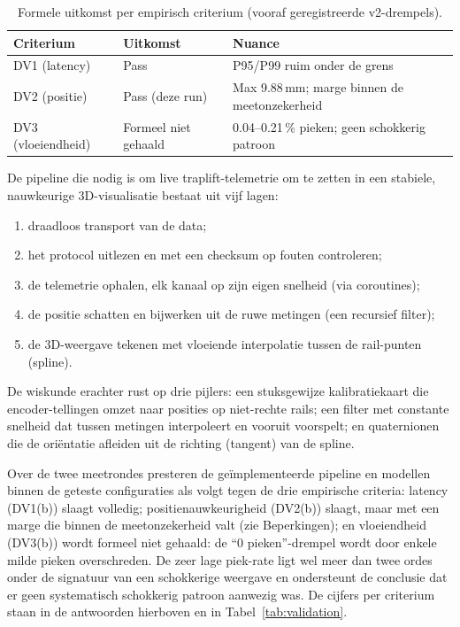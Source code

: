 \documentclass[10pt, a4paper, twocolumn]{article}
\begin{document}
\begin{table}[H]
\centering
\caption{Formele uitkomst per empirisch criterium (vooraf geregistreerde v2-drempels).}
\label{tab:criteria-outcome}
\small
\begin{tabular}{@{}p{1.9cm}p{1.8cm}p{4.0cm}@{}}
\toprule
\textbf{Criterium} & \textbf{Uitkomst} & \textbf{Nuance} \\
\midrule
DV1 (latency) & Pass & P95/P99 ruim onder de grens \\
DV2 (positie) & Pass (deze run) & Max 9.88\,mm; marge binnen de meetonzekerheid \\
DV3 (vloeiendheid) & Formeel niet gehaald & 0.04--0.21\,\% pieken; geen schokkerig patroon \\
\bottomrule
\end{tabular}
\end{table}

De pipeline die nodig is om live traplift-telemetrie om te zetten in een
stabiele, nauwkeurige 3D-visualisatie bestaat uit vijf lagen:
\begin{enumerate}[leftmargin=*]
  \item draadloos transport van de data;
  \item het protocol uitlezen en met een checksum op fouten controleren;
  \item de telemetrie ophalen, elk kanaal op zijn eigen snelheid (via coroutines);
  \item de positie schatten en bijwerken uit de ruwe metingen (een recursief filter);
  \item de 3D-weergave tekenen met vloeiende interpolatie tussen de rail-punten (spline).
\end{enumerate}
De wiskunde erachter rust op drie pijlers: een stuksgewijze kalibratiekaart die
encoder-tellingen omzet naar posities op niet-rechte rails; een filter met
constante snelheid dat tussen metingen interpoleert en vooruit voorspelt; en
quaternionen die de oriëntatie afleiden uit de richting (tangent) van de spline.

Over de twee meetrondes presteren de geïmplementeerde pipeline en modellen
binnen de geteste configuraties als volgt tegen de drie empirische criteria:
latency (DV1(b)) slaagt volledig; positienauwkeurigheid (DV2(b)) slaagt, maar
met een marge die binnen de meetonzekerheid valt (zie Beperkingen); en
vloeiendheid (DV3(b)) wordt formeel niet gehaald: de ``0 pieken''-drempel
wordt door enkele milde pieken overschreden. De zeer lage piek-rate ligt wel meer
dan twee ordes onder de signatuur van een schokkerige weergave en ondersteunt de
conclusie dat er geen systematisch schokkerig patroon aanwezig was. De cijfers per
criterium staan in de antwoorden hierboven en in Tabel~\ref{tab:validation}.
\end{document}
